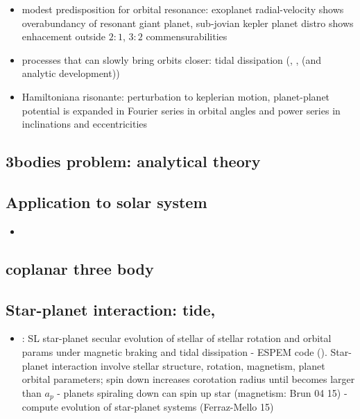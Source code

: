 \documentclass[main.tex]{subfiles}
\begin{document}
\begin{itemize}
\item modest predisposition for orbital resonance: exoplanet radial-velocity shows overabundancy of resonant giant planet, sub-jovian kepler planet distro shows enhacement outside $2:1$, $3:2$ commensurabilities
\item processes that can slowly bring orbits closer: tidal dissipation (\cite{goldreich1966q}, \cite{yoder1981tides}, \cite{peale1976orbital} (and analytic development))    
\item Hamiltoniana risonante: perturbation to keplerian motion, planet-planet potential is expanded in Fourier series in orbital angles and power series in inclinations and eccentricities
\end{itemize}

\subsection{3bodies problem: analytical theory}

\subsection{Application to solar system}
\begin{itemize}
    \item 
\end{itemize}
\subsection{coplanar three body}

\subsection{Star-planet interaction: tide, }

\begin{itemize}
    \item \cite{benbakoura2019evolution}: SL star-planet secular evolution of stellar of stellar rotation and orbital params under magnetic braking and tidal dissipation - ESPEM code (). Star-planet interaction involve stellar structure, rotation, magnetism, planet orbital parameters; spin down increases corotation radius until becomes larger than $a_p$ - planets spiraling down can spin up star (magnetism: Brun 04 15) - compute evolution of star-planet systems (Ferraz-Mello 15) 
\end{itemize}
\end{document}
